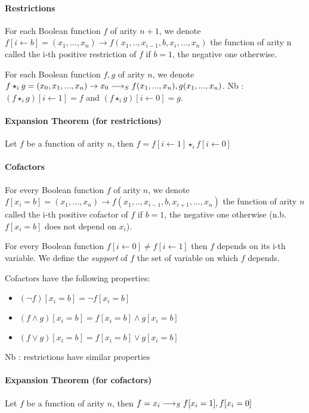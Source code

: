 \documentclass[a4paper,10pt]{article}
\begin{document}
\paragraph{Restrictions\\}

For each Boolean function $f$ of arity $n+1$, we denote $f[i\leftarrow b] = (x_1, ..., x_n) \rightarrow f(x_1, .., x_{i-1}, b, x_i, ..., x_n)$ the function of arity n called the i-th positive restriction of $f$ if $b=1$, the negative one otherwise.


For each Boolean function $f, g$ of arity $n$, we denote $f\star_i g  = (x_0, x_1, ..., x_n) \rightarrow x_0 \longrightarrow_S f(x_1, ..., x_n), g(x_1, ..., x_n)$. Nb : $ (f\star_i g)[i\leftarrow 1] = f$ and $ (f\star_i g)[i\leftarrow 0] = g$.

\paragraph{Expansion Theorem (for restrictions)\\}
Let $f$ be a function of arity $n$, then $f = f[i\leftarrow 1]\star_i f[i\leftarrow 0]$

\paragraph{Cofactors\\}

For every Boolean function $f$ of arity $n$, we denote $f[x_i = b] = (x_1, ..., x_n) \rightarrow f(x_1, .., x_{i-1}, b, x_{i+1}, ..., x_n)$ the function of arity $n$ called the i-th positive cofactor of $f$ if $b=1$, the negative one otherwise (n.b. $f[x_i = b]$ does not depend on $x_i$).


For every Boolean function $f[i\leftarrow 0] \neq f[i \leftarrow 1]$ then $f$ depends on its i-th variable. We define the \textit{support} of $f$ the set of variable on which $f$ depends.

Cofactors have the following properties:\begin{itemize}
\item $(\lnot f)[x_i = b] = \lnot f[x_i = b]$
\item $(f\land g)[x_i = b] = f[x_i = b] \land g[x_i = b]$
\item $(f\lor g)[x_i = b] = f[x_i = b] \lor g[x_i = b]$
\end{itemize}
Nb : restrictions have similar properties

\paragraph{Expansion Theorem (for cofactors)\\}
Let $f$ be a function of arity $n$, then $f = x_i \longrightarrow_S f[x_i=1], f[x_i=0]$
\end{document}
